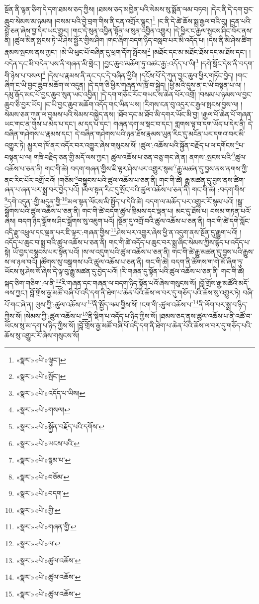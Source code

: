 སྔོན་ནི་ལྷན་ཅིག་དེ་དག་ཐམས་ཅད་ཀྱིས། །ཐམས་ཅད་མཁྱེན་པའི་སེམས་སུ་སྨོན་ལམ་བཏབ། །དེར་ནི་དེ་དག་བྱང་ཆུབ་སེམས་མ་ཉམས། །བསམ་པའི་བྱེ་བྲག་གིས་ནི་ངན་འགྲོར་ལྷུང་།\footnote{«སྣར་»«པེ་»ལྟུང་།} །ང་ནི་དེ་ཚེ་ཆོས་སྨྲ་རྒྱལ་བའི་བུ། །དྲན་པའི་བློ་ཅན་ཞེས་བྱ་དེར་ཡང་གྱུར། །གང་དེ་སུན་འབྱིན་སྟོན་ལ་སུན་འབྱིན་འགྱུར། །དེ་ཕྱིར་ང་རྒྱལ་སྤངས་ཤིང་བོར་ནས་ནི། །ཚུལ་མིན་སྤངས་ཏེ་ཡེ་ཤེས་སྦྱོར་གྱིས་ཤིག །གང་ཞིག་བདག་ཉིད་བསླབ་པར་མི་འདོད་པ། །དེས་ནི་མི་ཤེས་ཚིག་རྣམས་སྤངས་ནས་ཀྱང་། །མེ་ཡི་ཕུང་པོ་བཞིན་དུ་ཕྲག་དོག་སྤོངས།\footnote{«སྣར་»«པེ་»སྤོང་།} །མཐོང་དང་མ་མཐོང་ཐོས་དང་མ་ཐོས་དང་། །བདེན་དང་མི་བདེན་པས་ནི་གཞན་མི་གླེང་། །བྱང་ཆུབ་མཆོག་ཏུ་འཚང་རྒྱ་:འདོད་པ་ཡི།\footnote{«སྣར་»«པེ་»འདོད་པ་ཡིས།} །དགེ་སློང་དེས་ནི་བདག་གི་ཉེས་པ་བསལ།\footnote{«སྣར་»«པེ་»གསལ།} །དེས་པ་རྣམས་ནི་ནང་དང་དེ་བཞིན་ཕྱིའི། །དངོས་པོ་དེ་ཀུན་བྱང་ཆུབ་ཕྱིར་གཏོང་བྱེད། །གང་ཞིག་ང་ཡི་བྱང་ཆུབ་མཆོག་ལ་འདུན། །དེ་དག་ཅི་ཕྱིར་གཞན་ལ་ཁྲོ་བ་སྐྱེད། །ཕྱི་མའི་དུས་ན་ང་ཡི་བསྟན་པ་ལ། །དམུ་རྒོད་མང་པོ་བྱང་ཆུབ་སུན་ཡང་འབྱིན། །དེ་དག་གཅོང་རོང་གཡང་ས་ཆེན་པོར་འགྲོ། །བསམ་པ་ཉམས་ལ་བྱང་ཆུབ་ཅི་བྱར་ཡོད། །ང་ཡི་བྱང་ཆུབ་མཆོག་འདོད་གང་ཡིན་པས། །རིགས་ངན་བུ་འདྲར་ང་རྒྱལ་སྤངས་བྱས་ལ། །སེམས་ཅན་ཀུན་ལ་བྱམས་པའི་སེམས་བསྐྱེད་ནས། །ཐོབ་དང་མ་ཐོབ་མི་དགར་ཡོང་མི་བྱ། །རྒྱལ་པོ་ཆེན་པོ་གཞན་ཡང་གང་ན་གུས་པ་མེད་པ་དང་། མ་དད་པ་དང་། གཞན་དག་ལ་སྡང་བ་དང་། གླགས་ལྟ་བ་དག་ཡོད་པ་དེར་ནི། དེ་བཞིན་གཤེགས་པ་རྣམས་དང་། དེ་བཞིན་གཤེགས་པའི་ཉན་ཐོས་རྣམས་ཡུན་རིང་དུ་མངོན་པར་དགའ་བར་མི་འགྱུར་ཏེ། མྱུར་བ་ཁོ་ནར་འདོར་བར་འགྱུར་ཞེས་གསུངས་སོ། །ཚུལ་:འཆོས་པའི་སྐྱོན་བརྗོད་པ་ལ་དགོངས་\footnote{«སྣར་»«པེ་»སྐྱོན་བརྗོད་པའི་དགོས་}པ་བསྟན་པ་ལ། གཟི་བརྗིད་ཅན་གྱི་མདོ་ལས་ཀྱང་། ཚུལ་འཆོས་པ་ཅན་བཅུ་གང་ཞེ་ན། ནགས་:སྤངས་པའི་\footnote{«སྣར་»«པེ་»ཡངས་པའི་}ཚུལ་འཆོས་པ་ཅན་ནི། གང་གི་ཚེ། བདག་གཞན་གྱིས་ཇི་ལྟར་ཤེས་པར་འགྱུར་སྙམ་\footnote{«སྣར་»«པེ་»སྙམ་པ་}རྒྱུ་མཚན་དུ་བྱས་ནས་ནགས་ཀྱི་ནང་རིང་པོར་འགྲོ་བའོ། །གཅོམ་\footnote{«སྣར་»«པེ་»བཅོམ་}བསྐྱུངས་པའི་ཚུལ་འཆོས་པ་ཅན་ནི། གང་གི་ཚེ། རྒྱུ་མཚན་དུ་བྱས་ནས་ཚིག་ཞན་པ་ཞན་པར་སྨྲ་བར་བྱེད་པའོ། །མལ་སྟན་རིང་དུ་སྤོང་བའི་ཚུལ་འཆོས་པ་ཅན་ནི། གང་གི་ཚེ། :བདག་གིས་\footnote{«སྣར་»«པེ་»བདག་}དགེ་འདུན་:གྱི་མདུན་གྱི་\footnote{«སྣར་»«པེ་»གྱི་}མལ་སྟན་ལོངས་མི་སྤྱོད་པ་དེའི་ཚེ། བདག་ལ་མཆོད་པར་འགྱུར་རོ་སྙམ་པའོ། །སྒྲ་སྒྲོགས་པའི་ཚུལ་འཆོས་པ་ཅན་ནི། གང་གི་ཚེ་བདག་ཚུལ་ཁྲིམས་དང་ལྡན་པ། མང་དུ་ཐོས་པ། བསམ་གཏན་པའོ་ཞེས། བདག་ཉིད་སྒྲོགས་ཤིང་སྒྲོགས་སུ་འཇུག་པའོ། །སྔོན་དུ་འགྲོ་བའི་ཚུལ་འཆོས་པ་ཅན་ནི། གང་གི་ཚེ་དགེ་སློང་འདི་རྫུ་འཕྲུལ་དང་ལྡན་པར་ཇི་ལྟར་:གཞན་གྱིས་\footnote{«སྣར་»«པེ་»གཞན་གྱི་}ཤེས་པར་འགྱུར་ཞེས་ཕྱི་ན་འདུག་ནས་སྔོན་དུ་རྒྱུག་པའོ། །འདོད་པ་ཆུང་བ་སྨྲ་བའི་ཚུལ་འཆོས་པ་ཅན་ནི། གང་གི་ཚེ་འདོད་པ་ཆུང་བར་སྨྲ་ཞིང་སེམས་ཀྱིས་རྙེད་པ་འདོད་པ་སྟེ། ཡོ་བྱད་བསྙུངས་པར་སྟོན་པའོ། །ས་ལ་འདུག་པའི་ཚུལ་འཆོས་པ་ཅན་ནི། གང་གི་ཚེ་རྒྱུ་མཚན་དུ་བྱས་པའི་རྒྱུས་ས་ལ་ཉལ་བའོ། །ཚོགས་སུ་བསྒྲགས་པའི་ཚུལ་འཆོས་པ་ཅན་ནི། གང་གི་ཚེ། བདག་ནི་ཚོགས་ག་གེ་མོ་ཞིག་ཏུ་ཡོངས་སུ་ཤེས་སོ་ཞེས་དེ་ལྟ་བུ་རྒྱུ་མཚན་དུ་བྱེད་པའོ། །རི་གཞན་དུ་སྟོན་པའི་ཚུལ་འཆོས་པ་ཅན་ནི། གང་གི་ཚེ། སྐད་ཅིག་གཅིག་:ལ་ནི་\footnote{«སྣར་»«པེ་»ལ་}རི་གཞན་དང་གཞན་ལ་བདག་ཉིད་སྟོན་པའོ་ཞེས་གསུངས་སོ། །བློ་གྲོས་རྒྱ་མཚོའི་མདོ་ལས་ཀྱང་། བློ་གྲོས་རྒྱ་མཚོ་བཞི་པོ་འདི་དག་ནི་ཐེག་པ་ཆེན་པོའི་ཆོས་ལ་བར་དུ་གཅོད་པའི་ཆོས་སུ་འགྱུར་ཏེ། བཞི་པོ་གང་ཞེ་ན། ལུས་ཀྱི་:ཚུལ་འཆོས་པ་\footnote{«སྣར་»«པེ་»ཚུལ་འཆོས་}ནི་སྤྱོད་ལམ་གྱིས་སོ། །ངག་གི་:ཚུལ་འཆོས་པ་\footnote{«སྣར་»«པེ་»ཚུལ་འཆོས་}ནི་ལོག་པར་སྨྲ་བ་ཉིད་ཀྱིས་སོ། །སེམས་ཀྱི་:ཚུལ་འཆོས་པ་\footnote{«སྣར་»«པེ་»ཚུལ་འཆོས་}ནི་སྡིག་པ་འདོད་པ་ཉིད་ཀྱིས་སོ། །ཐམས་ཅད་ནས་ཚུལ་འཆོས་པ་ནི་འཚོ་བ་ཡོངས་སུ་མ་དག་པ་ཉིད་ཀྱིས་སོ། །བློ་གྲོས་རྒྱ་མཚོ་བཞི་པོ་འདི་དག་ནི་ཐེག་པ་ཆེན་པོའི་ཆོས་ལ་བར་དུ་གཅོད་པའི་ཆོས་སུ་འགྱུར་རོ་ཞེས་གསུངས་སོ། 